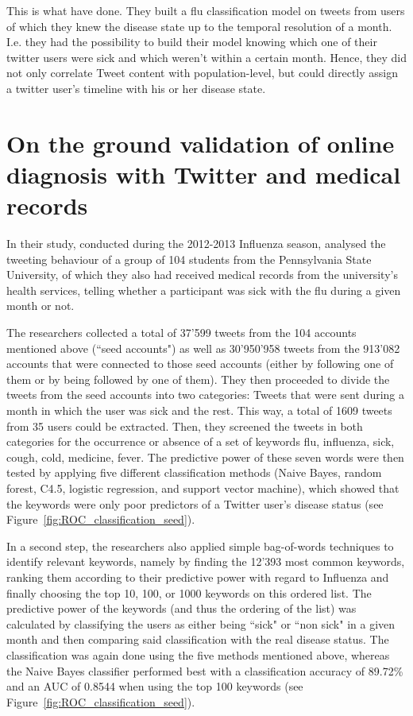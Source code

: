 \documentclass[11pt, a4paper]{report}\usepackage[]{graphicx}\usepackage[]{color}
\begin{document}
This is what \citep{bodnar_ground_2014} have done. They built a flu classification model on tweets from users of which they knew the disease state up to the temporal resolution of a month. I.e. they had the possibility to build their model knowing which one of their twitter users were sick and which weren't within a certain month. Hence, they did not only correlate Tweet content with population-level, but could directly assign a twitter user's timeline with his or her disease state.\newline

\section{On the ground validation of online diagnosis with Twitter and medical records}
In their study, conducted during the 2012-2013 Influenza season, \citep{bodnar_ground_2014} analysed the tweeting behaviour of a group of 104 students from the Pennsylvania State University, of which they also had received medical records from the university's health services, telling whether a participant was sick with the flu during a given month or not.\newline

The researchers collected a total of 37'599 tweets from the 104 accounts mentioned above (``seed accounts") as well as 30'950'958 tweets from the 913'082 accounts that were connected to those seed accounts (either by following one of them or by being followed by one of them). They then proceeded to divide the tweets from the seed accounts into two categories: Tweets that were sent during a month in which the user was sick and the rest. This way, a total of 1609 tweets from 35 users could be extracted. 
Then, they screened the tweets in both categories for the occurrence or absence of a set of keywords {flu, influenza, sick, cough, cold, medicine, fever}. The predictive power of these seven words were then tested by applying five different classification methods (Naive Bayes, random forest, C4.5, logistic regression, and support vector machine), which showed that the keywords were only poor predictors of a Twitter user's disease status (see Figure~\ref{fig:ROC_classification_seed}).

In a second step, the researchers also applied simple bag-of-words techniques to identify relevant keywords, namely by finding the 12'393 most common keywords, ranking them according to their predictive power with regard to Influenza and finally choosing the top 10, 100, or 1000 keywords on this ordered list. The predictive power of the keywords (and thus the ordering of the list) was calculated by classifying the users as either being ``sick" or ``non sick" in a given month and then comparing said classification with the real disease status. The classification was again done using the five methods mentioned above, whereas the Naive Bayes classifier performed best with a classification accuracy of 89.72\% and an AUC of 0.8544 when using the top 100 keywords (see Figure~\ref{fig:ROC_classification_seed}).
\end{document}

